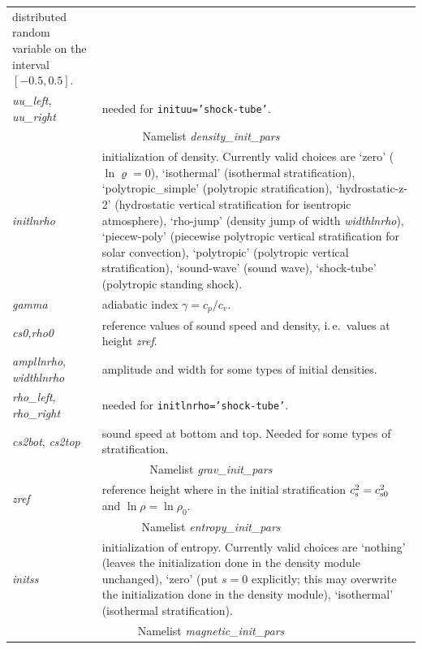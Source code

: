 \documentclass[12pt,twoside,notitlepage,a4paper]{article}
\makeatletter
\newcommand{\code}[1]{\texttt{#1}}
\newcommand{\var}[1]{\textsl{#1}\index{#1@\emph{#1}}\/}
\newcommand{\name}[1]{\textsl{#1}\index{#1}\/}
\makeatother
\begin{document}
\begin{longtable}{lp{}}
                 distributed random variable on the interval $[-0.5,0.5]$.\\
  \var{uu_left},
  \var{uu_right}
               & needed for \code{inituu='shock-tube'}.\\
%
\midrule
  \multicolumn{2}{c}{Namelist \name{density_init_pars}} \\
\midrule
  \var{initlnrho}
               & initialization of density. Currently valid choices are
                 `zero' ($\ln\varrho=0$),
                 `isothermal' (isothermal stratification),
                 `polytropic\_simple' (polytropic stratification),
                 `hydrostatic-z-2' (hydrostatic vertical stratification
                                    for isentropic atmosphere),
                 `rho-jump' (density jump of width \var{widthlnrho}),
                 `piecew-poly' (piecewise polytropic vertical
                               stratification for solar convection),
                 `polytropic' (polytropic vertical stratification),
                 `sound-wave' (sound wave),
                 `shock-tube' (polytropic standing shock).\\
  \var{gamma}  & adiabatic index $\gamma=c_p/c_v$. \\
  \var{cs0,rho0}
               & reference values of sound speed and density,
                 i.\,e.~values at height \var{zref}. \\
  \var{ampllnrho},
  \var{widthlnrho}
               & amplitude and width for some types of initial densities. \\
  \var{rho_left},
  \var{rho_right}
               & needed for \code{initlnrho='shock-tube'}. \\
  \var{cs2bot},
  \var{cs2top} & sound speed at bottom and top. Needed for some types of
                 stratification. \\ 
%
\midrule
  \multicolumn{2}{c}{Namelist \name{grav_init_pars}} \\
\midrule
  \var{zref}
               & reference height where in the initial stratification
                 $c_{\rm s}^2=c_{\rm s0}^2$ and $\ln\rho=\ln\rho_0$.\\
%
\midrule
  \multicolumn{2}{c}{Namelist \name{entropy_init_pars}} \\
\midrule
  \var{initss}
               & initialization of entropy. Currently valid choices are
                 `nothing' (leaves the initialization done in the density
                 module unchanged),
                 `zero' (put $s=0$ explicitly; this may overwrite the
                 initialization done in the density module),
                 `isothermal' (isothermal stratification).\\
%
\midrule
  \multicolumn{2}{c}{Namelist \name{magnetic_init_pars}} \\
\midrule






\end{longtable}
\end{document}
